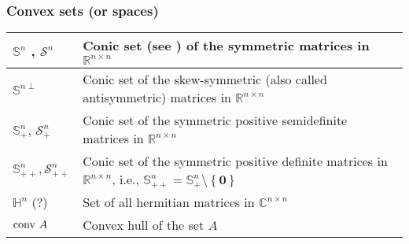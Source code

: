 \subsubsection{Convex sets (or spaces)}
\begin{xltabular}{\textwidth}{XX}
	\(\mathbb{S}^{n}\) \cite[sec. 2.2.2]{dattorroConvexOptimizationEuclidean2010}, \(\mathcal{S}^{n}\) \cite[sec. 1.6]{boydConvexOptimization2004}                        & Conic set (see \cite[p. 35]{boydConvexOptimization2004}) of the symmetric matrices in \(\mathbb{R}^{n\times n}\)                                                                                               \\ \hline
	\(\mathbb{S}^{n\perp}\) \cite[sec. 2.2.2]{dattorroConvexOptimizationEuclidean2010}                                                                                    & Conic set of the skew-symmetric (also called antisymmetric) matrices in \(\mathbb{R}^{n\times n}\)                                                                                                             \\ \hline
	\(\mathbb{S}_{+}^{n}\), \(\mathcal{S}_{+}^{n}\) \cite[sec. 2.2.5]{boydConvexOptimization2004}                                                                         & Conic set of the symmetric positive semidefinite matrices in \(\mathbb{R}^{n\times n}\) \cite{boydConvexOptimization2004}                                                                                      \\ \hline
	\(\mathbb{S}_{++}^{n}, \mathcal{S}_{++}^{n}\)   \cite[sec. 2.2.5]{boydConvexOptimization2004}                                                                         & Conic set of the symmetric positive definite matrices in \(\mathbb{R}^{n\times n}\), i.e., \(\mathbb{S}_{++}^{n} = \mathbb{S}_{+}^{n}\setminus \left\{ \mathbf{0} \right\}\) \cite{boydConvexOptimization2004} \\ \hline
	\(\mathbb{H}^{n}\) (?)                                                                                                                                                & Set of all hermitian matrices in \(\mathbb{C}^{n\times n}\)                                                                                                                                                    \\ \hline
	\(\textnormal{conv } A\) \cite[p. 34]{boydConvexOptimization2004}                                                                                                     & Convex hull of the set \(A\)                                                                                                                                                                                   \\ \hline

\end{xltabular}
